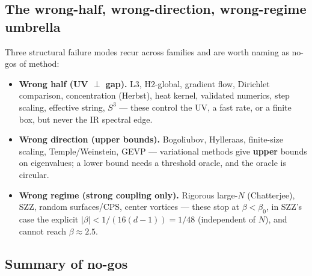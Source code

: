 \subsection{The wrong-half, wrong-direction, wrong-regime umbrella}

Three structural failure modes recur across families and are worth naming as no-gos of method:

\begin{itemize}
\item \textbf{Wrong half (UV $\perp$ gap).} L3, H2-global, gradient flow, Dirichlet comparison,
  concentration (Herbst), heat kernel, validated numerics, step scaling, effective string,
  $S^3$ --- these control the UV, a fast rate, or a finite box, but never the IR spectral edge.
\item \textbf{Wrong direction (upper bounds).} Bogoliubov, Hylleraas, finite-size scaling,
  Temple/Weinstein, GEVP --- variational methods give \textbf{upper} bounds on eigenvalues; a
  lower bound needs a threshold oracle, and the oracle is circular.
\item \textbf{Wrong regime (strong coupling only).} Rigorous large-$N$ (Chatterjee), SZZ, random
  surfaces/CPS, center vortices --- these stop at $\beta<\beta_0$, in SZZ's case the explicit
  $\lvert\beta\rvert<1/(16(d-1))=1/48$ (independent of $N$), and cannot reach $\beta\approx2.5$.
\end{itemize}

\subsection{Summary of no-gos}

